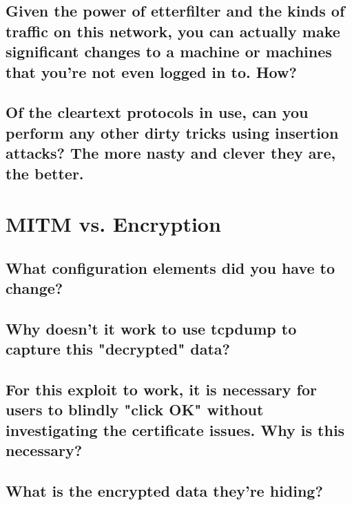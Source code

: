 \documentclass[12pt,letterpaper]{article}
\begin{document}

\subsection{Given the power of etterfilter and the kinds of traffic on this
network, you can actually make significant changes to a machine or machines
that you're not even logged in to. How?}

\subsection{Of the cleartext protocols in use, can you perform any other dirty
tricks using insertion attacks? The more nasty and clever they are, the better.}

\section{MITM vs. Encryption}

\subsection{What configuration elements did you have to change?}

\subsection{Why doesn't it work to use tcpdump to capture this "decrypted" data?}

\subsection{For this exploit to work, it is necessary for users to blindly "click OK"
without investigating the certificate issues. Why is this necessary?}

\subsection{What is the encrypted data they're hiding?}
\end{document}

